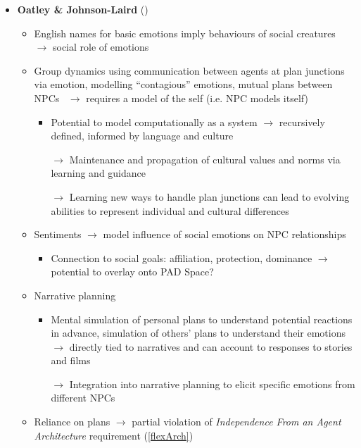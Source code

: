 \begin{itemize}
    \item \textbf{Oatley \& Johnson-Laird} (\good)
    \begin{itemize}
        \item English names for basic emotions imply behaviours of social
        creatures~\citep[p.~209]{johnson1992basic} $\rightarrow$ social role of
        emotions

        \item Group dynamics using communication between agents at plan
        junctions via emotion, modelling ``contagious'' emotions, mutual plans
        between NPCs~\citep[p.~31, 40--44]{oatley1987towards} $\rightarrow$
        requires a model of the self (i.e. NPC models itself)
        \begin{itemize}
            \item Potential to model computationally as a system $\rightarrow$
            recursively defined, informed by language and culture

            \item [$\rightarrow$] Maintenance and propagation of cultural
            values and norms via learning and guidance

            \item [$\rightarrow$] Learning new ways to handle plan junctions
            can lead to evolving abilities to represent individual and
            cultural differences
        \end{itemize}

        \item Sentiments $\rightarrow$ model influence of social emotions on
        NPC relationships~\citep[p.~78, 80--86]{oatley2000sentiments}
        \begin{itemize}
            \item Connection to social goals: affiliation, protection,
            dominance $\rightarrow$ potential to overlay onto PAD Space?
        \end{itemize}

        \item Narrative planning~\citep[p.~6--7, 107--108, 225]{oatley1992best}
        \begin{itemize}
            \item Mental simulation of personal plans to understand
            potential reactions in advance, simulation of others' plans to
            understand their emotions $\rightarrow$ directly tied to narratives
            and can account to responses to stories and films

            \item [$\rightarrow$] Integration into narrative planning to elicit
            specific emotions from different NPCs
        \end{itemize}

        \item Reliance on plans $\rightarrow$ partial violation of
        \textit{Independence From an Agent Architecture} requirement
        (\ref{flexArch})
    \end{itemize}
\end{itemize}

